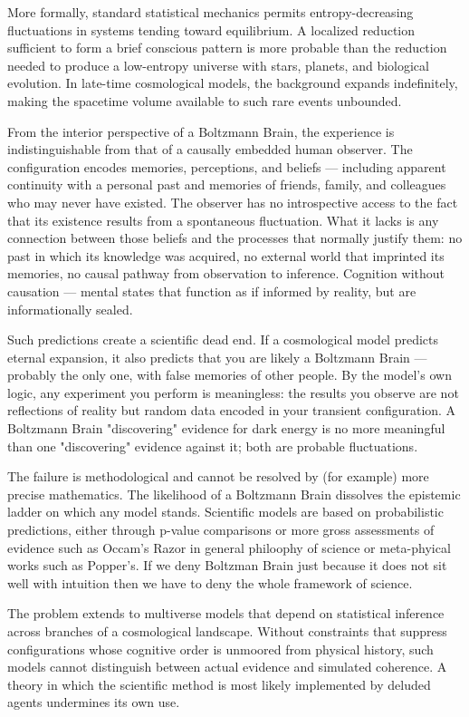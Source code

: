 More formally, standard statistical mechanics permits entropy-decreasing fluctuations in systems tending toward equilibrium. A localized reduction sufficient to form a brief conscious pattern is more probable than the reduction needed to produce a low-entropy universe with stars, planets, and biological evolution. In late-time cosmological models, the background expands indefinitely, making the spacetime volume available to such rare events unbounded.

From the interior perspective of a Boltzmann Brain, the experience is indistinguishable from that of a causally embedded human observer. The configuration encodes memories, perceptions, and beliefs — including apparent continuity with a personal past and memories of friends, family, and colleagues who may never have existed. The observer has no introspective access to the fact that its existence results from a spontaneous fluctuation. What it lacks is any connection between those beliefs and the processes that normally justify them: no past in which its knowledge was acquired, no external world that imprinted its memories, no causal pathway from observation to inference. Cognition without causation — mental states that function as if informed by reality, but are informationally sealed.

Such predictions create a scientific dead end. If a cosmological model predicts eternal expansion, it also predicts that you are likely a Boltzmann Brain — probably the only one, with false memories of other people. By the model's own logic, any experiment you perform is meaningless: the results you observe are not reflections of reality but random data encoded in your transient configuration. A Boltzmann Brain "discovering" evidence for dark energy is no more meaningful than one "discovering" evidence against it; both are probable fluctuations.

The failure is methodological and cannot be resolved by (for example) more precise mathematics. The likelihood of a Boltzmann Brain dissolves the epistemic ladder on which any model stands. Scientific models are based on probabilistic predictions, either through p-value comparisons or more gross assessments of evidence such as Occam's Razor in general philoophy of science or meta-phyical works such as Popper's. If we deny Boltzman Brain just because it does not sit well with intuition then we have to deny the whole framework of science.

The problem extends to multiverse models that depend on statistical inference across branches of a cosmological landscape. Without constraints that suppress configurations whose cognitive order is unmoored from physical history, such models cannot distinguish between actual evidence and simulated coherence. A theory in which the scientific method is most likely implemented by deluded agents undermines its own use.

